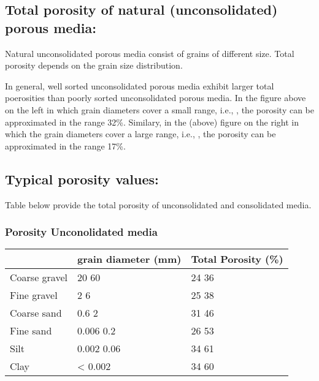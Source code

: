 \documentclass[letterpaper,10pt,english]{sphinxmanual}
\let\sphinxpxdimen\pdfpxdimen\else\newdimen\sphinxpxdimen
\begin{document}
\subsection{Total porosity of natural (unconsolidated) porous media:}
\label{\detokenize{contents/flow/lecture_02/12_subsurface_structure:total-porosity-of-natural-unconsolidated-porous-media}}
Natural unconsolidated porous media consist of grains of different size. Total porosity depends on the grain size distribution.



\noindent\sphinxincludegraphics[width=600\sphinxpxdimen]{{L02_fig5b}.png}



In general, well sorted unconsolidated porous media exhibit larger total poerosities than poorly sorted unconsolidated porous media. In the figure above on the left in which grain diameters cover a small range, i.e., , the porosity can be approximated in the range 32\%. Similary, in the (above) figure on the right in which the grain diameters cover a large range, i.e., , the porosity can be approximated in the range 17\%.


\subsection{Typical porosity values:}
\label{\detokenize{contents/flow/lecture_02/12_subsurface_structure:typical-porosity-values}}
Table below provide the total porosity of unconsolidated and consolidated media.
\subsubsection*{Porosity \sphinxhyphen{} Unconolidated media}


\begin{savenotes}\sphinxattablestart
\centering
\begin{tabulary}{\linewidth}[t]{|T|T|T|}
\hline


&\sphinxstyletheadfamily 
grain  diameter  (mm)
&\sphinxstyletheadfamily 
Total  Porosity (\%)
\\
\hline
Coarse gravel
&
20 \sphinxhyphen{} 60
&
24 \sphinxhyphen{} 36
\\
\hline
Fine gravel
&
2 \sphinxhyphen{} 6
&
25 \sphinxhyphen{} 38
\\
\hline
Coarse sand
&
0.6 \sphinxhyphen{} 2
&
31 \sphinxhyphen{} 46
\\
\hline
Fine sand
&
0.006 \sphinxhyphen{} 0.2
&
26 \sphinxhyphen{} 53
\\
\hline
Silt
&
0.002 \sphinxhyphen{} 0.06
&
34 \sphinxhyphen{} 61
\\
\hline
Clay
&
\textless{} 0.002
&
34 \sphinxhyphen{} 60
\\
\hline
\end{tabulary}
\par
\sphinxattableend\end{savenotes}
\end{document}

